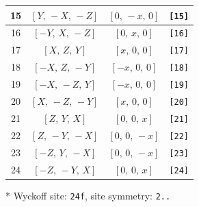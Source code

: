 \documentclass[fleqn,8pt]{jsarticle}
\begin{document}
\begin{longtable}{cccc}
15 & $\left[ Y,\, - X,\, - Z \right]$ & $\left[ 0,\, - x,\, 0 \right]$ & {\tt [15]} \\ \hline
16 & $\left[ - Y,\, X,\, - Z \right]$ & $\left[ 0,\, x,\, 0 \right]$ & {\tt [16]} \\ \hline
17 & $\left[ X,\, Z,\, Y \right]$ & $\left[ x,\, 0,\, 0 \right]$ & {\tt [17]} \\ \hline
18 & $\left[ - X,\, Z,\, - Y \right]$ & $\left[ - x,\, 0,\, 0 \right]$ & {\tt [18]} \\ \hline
19 & $\left[ - X,\, - Z,\, Y \right]$ & $\left[ - x,\, 0,\, 0 \right]$ & {\tt [19]} \\ \hline
20 & $\left[ X,\, - Z,\, - Y \right]$ & $\left[ x,\, 0,\, 0 \right]$ & {\tt [20]} \\ \hline
21 & $\left[ Z,\, Y,\, X \right]$ & $\left[ 0,\, 0,\, x \right]$ & {\tt [21]} \\ \hline
22 & $\left[ Z,\, - Y,\, - X \right]$ & $\left[ 0,\, 0,\, - x \right]$ & {\tt [22]} \\ \hline
23 & $\left[ - Z,\, Y,\, - X \right]$ & $\left[ 0,\, 0,\, - x \right]$ & {\tt [23]} \\ \hline
24 & $\left[ - Z,\, - Y,\, X \right]$ & $\left[ 0,\, 0,\, x \right]$ & {\tt [24]} \\
\end{longtable}
* Wyckoff site: {\tt 24f}, site symmetry: {\tt 2..}
\renewcommand{\arraystretch}{1.2}
\end{document}
